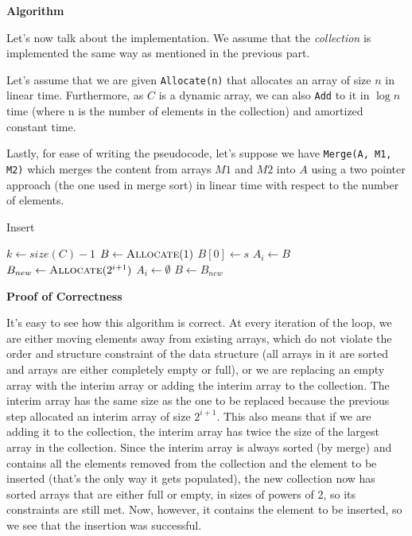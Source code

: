 \documentclass{article}
\begin{document}
\textbf{Algorithm}

Let's now talk about the implementation. We assume that the \textit{collection} is implemented the same way
as mentioned in the previous part.

Let's assume that we are given \texttt{Allocate(n)} that allocates an array of size $n$ in linear time.
Furthermore, as $C$ is a dynamic array, we can also \texttt{Add} to it in $\log n$ time (where n is the number of
elements in the collection) and amortized constant time.

Lastly, for ease of writing the pseudocode, let's suppose we have \texttt{Merge(A, M1, M2)} which merges the content
from arrays $M1$ and $M2$ into $A$ using a two pointer approach (the one used in merge sort) in linear time with
respect to the number of elements.


\begin{algorithm}
    \caption{Insert}\label{euclid}

    \begin{algorithmic}[1]
        \State $k \gets size(C) - 1$            
        \State $B \gets \Call{Allocate}{1}$     
        \State $B[0] \gets s$
            \State {} 
            \EndIf
                \State $A_i \gets B$
                \State \Return
            \EndIf
            \State $B_{new} \gets \Call{Allocate}{2^{i+1}}$    
            \State {}
            \State $A_i \gets \emptyset$   
            \State $B \gets B_{new}$
        \EndFor
        \EndProcedure
    \end{algorithmic}
\end{algorithm}

\newline

\textbf{Proof of Correctness}

It's easy to see how this algorithm is correct. At every iteration of the loop, we are either moving
elements away from existing arrays, which do not violate the order and structure constraint of the
data structure (all arrays in it are sorted and arrays are either completely empty or full), or
we are replacing an empty array with the interim array or adding the interim array to the collection.
The interim array has the same size as the one to be replaced because the previous step allocated an interim array of
size $2^{i+1}$. This also means that if we are adding it to the collection, the interim array has twice
the size of the largest array in the collection. Since the interim array is always sorted (by merge) and contains
all the elements removed from the collection and the element to be inserted (that's the only way it gets
populated), the new collection now has sorted arrays that are either full or empty, in sizes of powers of 2, so its
constraints are still met. Now, however, it contains the element to be inserted, so we see that the insertion was
successful.
\end{document}
